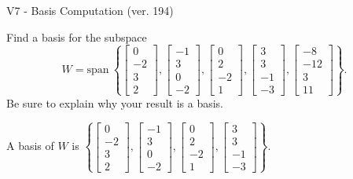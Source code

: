 \begin{exercise}
  \begin{exerciseTitle}V7 - Basis Computation (ver. 194)\end{exerciseTitle}
  \begin{exerciseStatement}
    Find a basis for the subspace 
\[W=\mathrm{span}\ \left\{\left[\begin{array}{r}
0 \\
-2 \\
3 \\
2
\end{array}\right] , \left[\begin{array}{r}
-1 \\
3 \\
0 \\
-2
\end{array}\right] , \left[\begin{array}{r}
0 \\
2 \\
-2 \\
1
\end{array}\right] , \left[\begin{array}{r}
3 \\
3 \\
-1 \\
-3
\end{array}\right] , \left[\begin{array}{r}
-8 \\
-12 \\
3 \\
11
\end{array}\right]\right\}.\]
 Be sure to explain why your result is a basis.


  \end{exerciseStatement}
  \begin{exerciseAnswer}
   A basis of \(W\) is  \(\left\{\left[\begin{array}{r}
0 \\
-2 \\
3 \\
2
\end{array}\right] , \left[\begin{array}{r}
-1 \\
3 \\
0 \\
-2
\end{array}\right] , \left[\begin{array}{r}
0 \\
2 \\
-2 \\
1
\end{array}\right] , \left[\begin{array}{r}
3 \\
3 \\
-1 \\
-3
\end{array}\right]\right\}\).
  


  \end{exerciseAnswer}
\end{exercise}